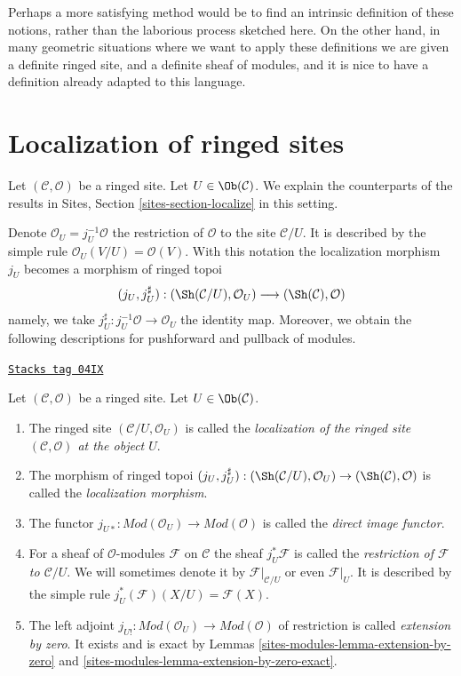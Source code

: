 \medskip\noindent
Perhaps a more satisfying method would be to find an intrinsic definition
of these notions, rather than the laborious process sketched here.
On the other hand, in many geometric situations where we want to apply
these definitions we are given a definite ringed site, and a definite
sheaf of modules, and it is nice to have a definition already adapted to
this language.

\section{Localization of ringed sites}
\label{sites-modules-section-localize}
Let $(\mathcal{C}, \mathcal{O})$ be a ringed site.
Let $U \in \Ob(\mathcal{C})$.
We explain the counterparts of the results in
Sites, Section \ref{sites-section-localize}
in this setting.

\medskip\noindent
Denote
$\mathcal{O}_U = j_U^{-1}\mathcal{O}$ the restriction of $\mathcal{O}$
to the site $\mathcal{C}/U$. It is described by the simple
rule $\mathcal{O}_U(V/U) = \mathcal{O}(V)$. With this notation
the localization morphism $j_U$ becomes a morphism of ringed topoi
$$
(j_U, j_U^\sharp) :
(\Sh(\mathcal{C}/U), \mathcal{O}_U)
\longrightarrow
(\Sh(\mathcal{C}), \mathcal{O})
$$
namely, we take $j_U^\sharp : j_U^{-1}\mathcal{O} \to \mathcal{O}_U$
the identity map.
Moreover, we obtain the following descriptions for pushforward
and pullback of modules.

\begin{definition}
\label{sites-modules-definition-localize-ringed-site}
\href{https://stacks.math.columbia.edu/tag/04IX}{\texttt{Stacks tag 04IX}}

Let $(\mathcal{C}, \mathcal{O})$ be a ringed site.
Let $U \in \Ob(\mathcal{C})$.
\begin{enumerate}
\item The ringed site $(\mathcal{C}/U, \mathcal{O}_U)$ is called the
{\it localization of the ringed site $(\mathcal{C}, \mathcal{O})$
at the object $U$}.
\item The morphism of ringed topoi
$(j_U, j_U^\sharp) :
(\Sh(\mathcal{C}/U), \mathcal{O}_U)
\to
(\Sh(\mathcal{C}), \mathcal{O})$
is called the {\it localization morphism}.
\item The functor
$j_{U*} : \textit{Mod}(\mathcal{O}_U) \to \textit{Mod}(\mathcal{O})$
is called the {\it direct image functor}.
\item For a sheaf of $\mathcal{O}$-modules $\mathcal{F}$ on $\mathcal{C}$
the sheaf $j_U^*\mathcal{F}$ is called the
{\it restriction of $\mathcal{F}$ to $\mathcal{C}/U$}.
We will sometimes denote it by
$\mathcal{F}|_{\mathcal{C}/U}$ or even $\mathcal{F}|_U$.
It is described by the simple rule $j_U^*(\mathcal{F})(X/U) = \mathcal{F}(X)$.
\item The left adjoint
$j_{U!} : \textit{Mod}(\mathcal{O}_U) \to \textit{Mod}(\mathcal{O})$
of restriction is called {\it extension by zero}. It exists and is
exact by
Lemmas \ref{sites-modules-lemma-extension-by-zero} and
\ref{sites-modules-lemma-extension-by-zero-exact}.
\end{enumerate}
\end{definition}

